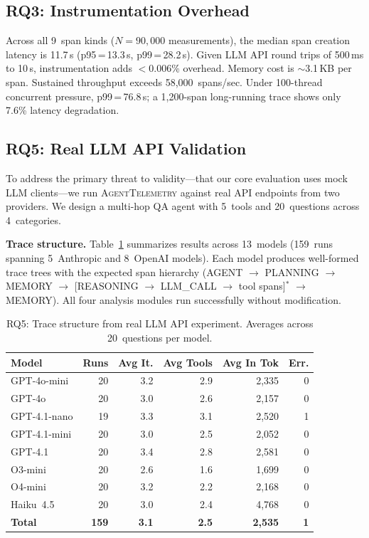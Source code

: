 \documentclass{article}
\begin{document}
\subsection{RQ3: Instrumentation Overhead}
\label{sec:rq3}

Across all 9~span kinds ($N{=}90{,}000$ measurements), the median
span creation latency is 11.7\,\textmu s (p95\,=\,13.3\,\textmu s,
p99\,=\,28.2\,\textmu s).  Given LLM API round trips of 500\,ms to
10\,s, instrumentation adds $<$0.006\% overhead.  Memory cost is
$\sim$3.1\,KB per span.  Sustained throughput exceeds
58,000~spans/sec.  Under 100-thread concurrent pressure,
p99\,=\,76.8\,\textmu s; a 1,200-span long-running trace shows only
7.6\% latency degradation.

\subsection{RQ5: Real LLM API Validation}
\label{sec:rq5}

To address the primary threat to validity---that our core evaluation uses
mock LLM clients---we run \textsc{AgentTelemetry} against real API
endpoints from two providers.  We design a multi-hop QA agent with
5~tools and 20~questions across 4~categories.

\textbf{Trace structure.}
Table~\ref{tab:rq5-structure} summarizes results across 13~models
(159~runs spanning 5~Anthropic and 8~OpenAI models).  Each model produces well-formed trace trees with the
expected span hierarchy (AGENT $\to$ PLANNING $\to$ MEMORY $\to$
[REASONING $\to$ LLM\_CALL $\to$ tool spans]$^*$ $\to$ MEMORY).  All
four analysis modules run successfully without modification.

\begin{table}[t]
\centering
\small
\caption{RQ5: Trace structure from real LLM API experiment.
Averages across 20~questions per model.}
\label{tab:rq5-structure}
\begin{tabular}{@{}lrrrrr@{}}
\toprule
\textbf{Model} & \textbf{Runs} & \textbf{Avg It.} & \textbf{Avg Tools} & \textbf{Avg In Tok} & \textbf{Err.} \\
\midrule
GPT-4o-mini     & 20 & 3.2 & 2.9 & 2{,}335 & 0 \\
GPT-4o          & 20 & 3.0 & 2.6 & 2{,}157 & 0 \\
GPT-4.1-nano    & 19 & 3.3 & 3.1 & 2{,}520 & 1 \\
GPT-4.1-mini    & 20 & 3.0 & 2.5 & 2{,}052 & 0 \\
GPT-4.1         & 20 & 3.4 & 2.8 & 2{,}581 & 0 \\
O3-mini         & 20 & 2.6 & 1.6 & 1{,}699 & 0 \\
O4-mini         & 20 & 3.2 & 2.2 & 2{,}168 & 0 \\
Haiku~4.5       & 20 & 3.0 & 2.4 & 4{,}768 & 0 \\
\midrule
\textbf{Total}  & \textbf{159} & \textbf{3.1} & \textbf{2.5} & \textbf{2{,}535} & \textbf{1} \\
\bottomrule
\end{tabular}
\end{table}
\end{document}
